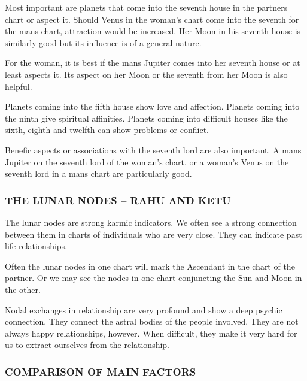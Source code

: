  

Most important are planets that come into the seventh house in the partners chart or aspect it. Should Venus in the woman’s chart come into the seventh for the mans chart, attraction would be increased. Her Moon in his seventh house is similarly good but its influence is of a general nature.

 

For the woman, it is best if the mans Jupiter comes into her seventh house or at least aspects it. Its aspect on her Moon or the seventh from her Moon is also helpful.

 

Planets coming into the fifth house show love and affection. Planets coming into the ninth give spiritual affinities. Planets coming into difficult houses like the sixth, eighth and twelfth can show problems or conflict.

 

Benefic aspects or associations with the seventh lord are also important. A mans Jupiter on the seventh lord of the woman’s chart, or a woman’s Venus on the seventh lord in a mans chart are particularly good.

 

\subsubsection{THE LUNAR NODES – RAHU AND KETU}

 

The lunar nodes are strong karmic indicators. We often see a strong connection between them in charts of individuals who are very close. They can indicate past life relationships.

 

Often the lunar nodes in one chart will mark the Ascendant in the chart of the partner. Or we may see the nodes in one chart conjuncting the Sun and Moon in the other.

 

Nodal exchanges in relationship are very profound and show a deep psychic connection. They connect the astral bodies of the people involved. They are not always happy relationships, however. When difficult, they make it very hard for us to extract ourselves from the relationship.

 

\subsubsection{COMPARISON OF MAIN FACTORS}
 

